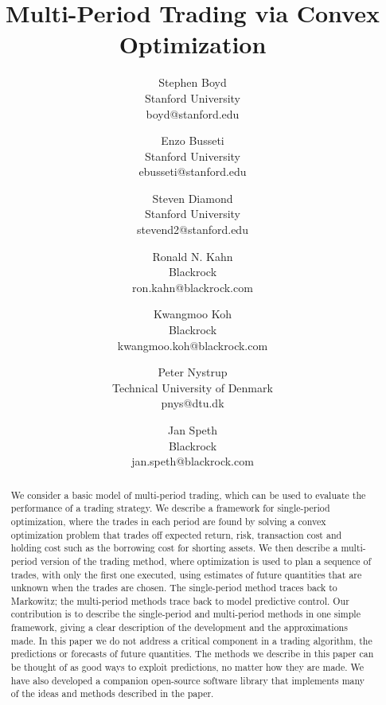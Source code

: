 \documentclass[openany]{article}  %
\begin{document}
\title{Multi-Period Trading via Convex Optimization}

\author{
Stephen Boyd \\
Stanford University \\
boyd@stanford.edu
\and
Enzo Busseti \\
Stanford University \\
ebusseti@stanford.edu
\and
Steven Diamond \\
Stanford University \\
stevend2@stanford.edu
\and
Ronald N. Kahn \\
Blackrock \\
ron.kahn@blackrock.com
\and
Kwangmoo Koh \\
Blackrock \\
kwangmoo.koh@blackrock.com
\and
Peter Nystrup \\
Technical University of Denmark \\
pnys@dtu.dk
\and
Jan Speth \\
Blackrock \\
jan.speth@blackrock.com
}

\frontmatter

\maketitle

\tableofcontents

\mainmatter

\begin{abstract}
We consider a basic model of multi-period trading, which can
be used to evaluate the performance of a trading strategy.
We describe a framework for single-period optimization,
where the trades in each period are found by solving a
convex optimization problem that trades off expected return,
risk, transaction cost and holding cost such as the
borrowing cost for shorting assets.
We then describe a multi-period version of the trading
method, where optimization is used to plan a sequence of
trades, with only the first one executed, using estimates
of future quantities that are unknown when the trades
are chosen.
The single-period method traces back to Markowitz;
the multi-period methods trace back to model predictive control.
\nocite{bemporad2006model,mattingley2011receding}
Our contribution is to describe the single-period and
multi-period methods in one simple framework, giving a clear
description of the development and the approximations made.
In this paper we do not address a critical component in
a trading algorithm, the predictions or forecasts
of future quantities.
The methods we describe in this paper can be thought of as
good ways to exploit predictions, no matter how they are made.
We have also developed a companion open-source software library
that implements many of the ideas and methods described in
the paper.
\end{abstract}
\end{document}
